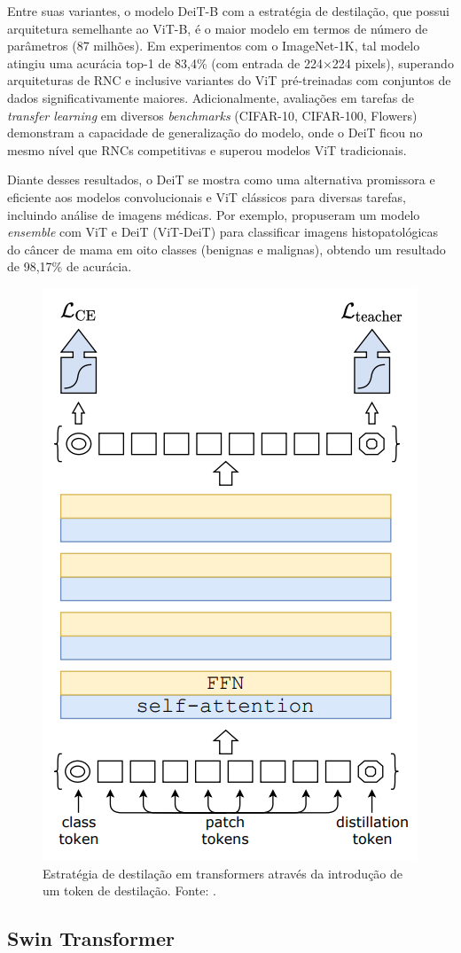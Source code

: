 Entre suas variantes, o modelo DeiT-B com a estratégia de destilação, que possui arquitetura semelhante ao ViT-B, é o maior modelo em termos de número de parâmetros (87 milhões). Em experimentos com o ImageNet-1K, tal modelo atingiu uma acurácia top-1 de 83,4\% (com entrada de 224×224 pixels), superando arquiteturas de RNC e inclusive variantes do ViT pré-treinadas com conjuntos de dados significativamente maiores. Adicionalmente, avaliações em tarefas de \textit{transfer learning} em diversos \textit{benchmarks} (CIFAR-10, CIFAR-100, Flowers) demonstram a capacidade de generalização do modelo, onde o DeiT ficou no mesmo nível que RNCs competitivas e superou modelos ViT tradicionais.

Diante desses resultados, o DeiT se mostra como uma alternativa promissora e eficiente aos modelos convolucionais e ViT clássicos para diversas tarefas, incluindo análise de imagens médicas. Por exemplo,  propuseram um modelo \textit{ensemble} com ViT e DeiT (ViT-DeiT) para classificar imagens histopatológicas do câncer de mama em oito classes (benignas e malignas), obtendo um resultado de 98,17\% de acurácia.

\begin{figure}[!htbp]
    \centering
    \includegraphics[width=0.5\linewidth]{figs/distillation-procedure-deit.png}
    \caption{Estratégia de destilação em transformers através da introdução de um token de destilação. Fonte: .}
    \label{fig:distillation-procedure}
\end{figure}

\subsection{Swin Transformer}

